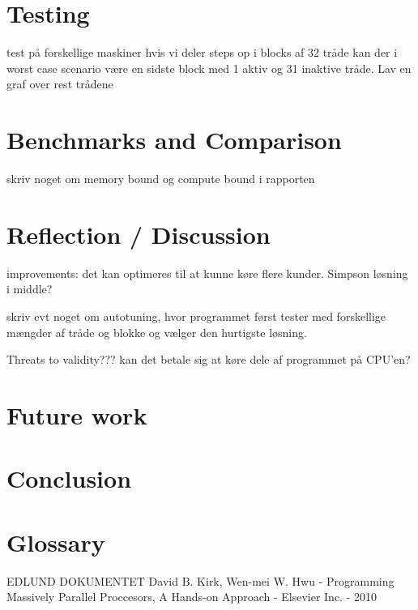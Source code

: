 \documentclass[oribibl]{llncs}
\begin{document}
	
	\label{cuda}
		
	\section{Testing}
	test på forskellige maskiner
	hvis vi deler steps op i blocks af 32 tråde kan der i worst case scenario være en sidste block med 1 aktiv og 31 inaktive tråde.
	Lav en graf over rest trådene
		
	
	\label{testing}
		
	\section{Benchmarks and Comparison}
		skriv noget om memory bound og compute bound i rapporten
	
	\label{bandc}
	
	\section{Reflection / Discussion}
	improvements:
	det kan optimeres til at kunne køre flere kunder.
	Simpson løsning i middle?
		
		skriv evt noget om autotuning, hvor programmet først tester med forskellige mængder af tråde og blokke og vælger den hurtigste løsning.
		
		Threats to validity???
		kan det betale sig at køre dele af programmet på CPU'en?
		
	
	\label{reflection}
		
	\section{Future work}
	
	
	\label{futurework}
	
	\section{Conclusion}
	
	
	\label{conclusion}
		
	\section{Glossary}
	
	
		
	\begin{thebibliography}{9}
			 EDLUND DOKUMENTET
			 David B. Kirk, Wen-mei W. Hwu - Programming Massively Parallel Proccesors, A Hands-on Approach - Elsevier Inc. - 2010
	\end{thebibliography}
	
\end{document}
